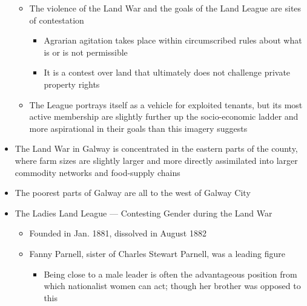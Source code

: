 \documentclass[12pt]{article}
\begin{document}
\begin{itemize}
\begin{itemize}
                    \item The violence of the Land War and the goals of the Land League are sites of contestation
                    \begin{itemize}
                        \item Agrarian agitation takes place within circumscribed rules about what is or is not permissible
                        \item It is a contest over land that ultimately does not challenge private property rights
                    \end{itemize}
                    \item The League portrays itself as a vehicle for exploited tenants, but its most active membership are slightly further up the socio-economic ladder and more aspirational in their goals than this imagery suggests
                \end{itemize}
                \item The Land War in Galway is concentrated in the eastern parts of the county, where farm sizes are slightly larger and more directly assimilated into larger commodity networks and food-supply chains
                \item The poorest parts of Galway are all to the west of Galway City
                \item The Ladies Land League --- Contesting Gender during the Land War
                \begin{itemize}
                    \item Founded in Jan. 1881, dissolved in August 1882
                    \item Fanny Parnell, sister of Charles Stewart Parnell, was a leading figure
                    \begin{itemize}
                        \item Being close to a male leader is often the advantageous position from which nationalist women can act; though her brother was opposed to this
                    \end{itemize}
                \end{itemize}
            \end{itemize}
\end{document}
